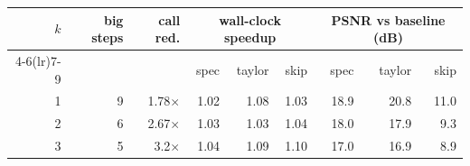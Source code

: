 \begin{tabular}{rrrrrrrrr}
\toprule
$k$ & big steps & call red. & \multicolumn{3}{c}{wall-clock speedup} & \multicolumn{3}{c}{PSNR vs baseline (dB)} \\
\cmidrule(lr){4-6}\cmidrule(lr){7-9}
 & & & spec & taylor & skip & spec & taylor & skip \\
\midrule
1 & 9 & 1.78$\times$ & 1.02 & 1.08 & 1.03 & 18.9 & 20.8 & 11.0 \\
2 & 6 & 2.67$\times$ & 1.03 & 1.03 & 1.04 & 18.0 & 17.9 & 9.3 \\
3 & 5 & 3.2$\times$ & 1.04 & 1.09 & 1.10 & 17.0 & 16.9 & 8.9 \\
\bottomrule
\end{tabular}

